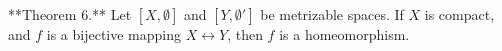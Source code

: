 **Theorem 6.** Let $[X, \emptyset]$ and $[Y, \emptyset']$ be metrizable spaces. If $X$ is compact, and $f$ is a bijective mapping $X \leftrightarrow Y$, then $f$ is a homeomorphism.
